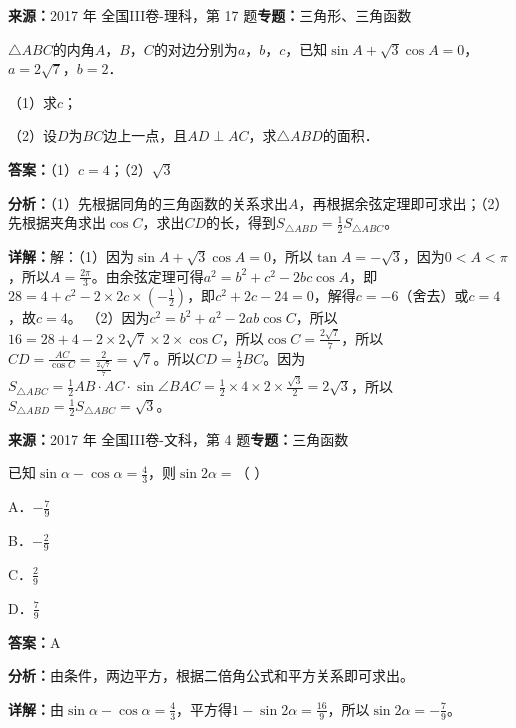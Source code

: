 \begin{question}[points=12]
\textbf{来源：}2017 年 全国III卷-理科，第 17 题\quad \textbf{专题：}三角形、三角函数\par
$\triangle ABC$的内角$A$，$B$，$C$的对边分别为$a$，$b$，$c$，已知$\sin A+\sqrt{3}\cos A=0$，$a=2\sqrt{7}$，$b=2$．

（1）求$c$；

（2）设$D$为$BC$边上一点，且$AD\perp AC$，求$\triangle ABD$的面积．
\begin{solution}
\textbf{答案：}（1）$c=4$；（2）$\sqrt{3}$

\textbf{分析：}（1）先根据同角的三角函数的关系求出$A$，再根据余弦定理即可求出；（2）先根据夹角求出$\cos C$，求出$CD$的长，得到$S_{\triangle ABD}=\frac{1}{2}S_{\triangle ABC}$。

\textbf{详解：}解：（1）因为$\sin A+\sqrt{3}\cos A=0$，所以$\tan A=-\sqrt{3}$，因为$0<A<\pi$，所以$A=\frac{2\pi}{3}$。由余弦定理可得$a^2=b^2+c^2-2bc\cos A$，即$28=4+c^2-2\times2c\times(-\frac{1}{2})$，即$c^2+2c-24=0$，解得$c=-6$（舍去）或$c=4$，故$c=4$。
（2）因为$c^2=b^2+a^2-2ab\cos C$，所以$16=28+4-2\times2\sqrt{7}\times2\times\cos C$，所以$\cos C=\frac{2\sqrt{7}}{7}$，所以$CD=\frac{AC}{\cos C}=\frac{2}{\frac{2\sqrt{7}}{7}}=\sqrt{7}$。所以$CD=\frac{1}{2}BC$。因为$S_{\triangle ABC}=\frac{1}{2}AB\cdot AC\cdot\sin\angle BAC=\frac{1}{2}\times4\times2\times\frac{\sqrt{3}}{2}=2\sqrt{3}$，所以$S_{\triangle ABD}=\frac{1}{2}S_{\triangle ABC}=\sqrt{3}$。
\end{solution}
\end{question}

\begin{question}[points=5]
\textbf{来源：}2017 年 全国III卷-文科，第 4 题\quad \textbf{专题：}三角函数\par
已知$\sin\alpha-\cos\alpha=\frac{4}{3}$，则$\sin2\alpha=$（    ）
\begin{choices}
  \item A．$-\frac{7}{9}$
  \item B．$-\frac{2}{9}$
  \item C．$\frac{2}{9}$
  \item D．$\frac{7}{9}$
\end{choices}
\begin{solution}
\textbf{答案：}A

\textbf{分析：}由条件，两边平方，根据二倍角公式和平方关系即可求出。

\textbf{详解：}由$\sin\alpha-\cos\alpha=\frac{4}{3}$，平方得$1-\sin2\alpha=\frac{16}{9}$，所以$\sin2\alpha=-\frac{7}{9}$。
\end{solution}
\end{question}

